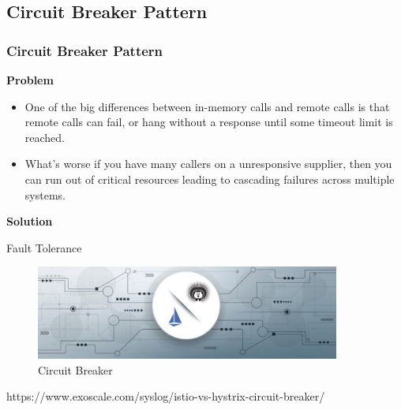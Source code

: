 \documentclass{beamer}
\begin{document}
	\subsection {Circuit Breaker Pattern}
		\begin{frame}
			\frametitle{Circuit Breaker Pattern}
			\textbf {Problem} \par
			\begin{itemize}
				\item<1-> \scriptsize {One of the big differences between in-memory calls and remote calls is that remote calls can fail, or hang without a response until some timeout limit is reached}.
				\item<2-> \scriptsize {What's worse if you have many callers on a unresponsive supplier, then you can run out of critical resources leading to cascading failures across multiple systems}.
			\end{itemize}  
			\textbf {Solution} \par
			\hspace{3mm} \small {Fault Tolerance}
			\begin{figure}[h]
				\includegraphics[width=100mm,scale=1]{img/cbp.png}
				\caption{Circuit Breaker}
			\end{figure}\vspace{20mm}
		
			\tiny{https://www.exoscale.com/syslog/istio-vs-hystrix-circuit-breaker/}	
		\end{frame}
\end{document}
